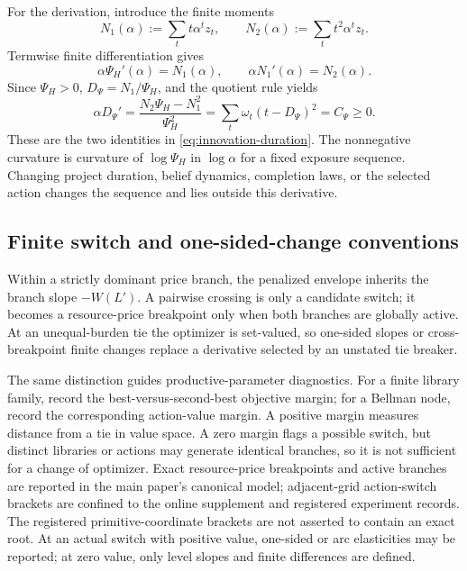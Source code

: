For the derivation, introduce the finite moments
\[
 N_1(\alpha):=\sum_t t\alpha^tz_t,
 \qquad
 N_2(\alpha):=\sum_t t^2\alpha^tz_t.
\]
Termwise finite differentiation gives
\[
 \alpha\Psi_H'(\alpha)=N_1(\alpha),
 \qquad
 \alpha N_1'(\alpha)=N_2(\alpha).
\]
Since \(\Psi_H>0\), \(D_\Psi=N_1/\Psi_H\), and the quotient rule yields
\[
 \alpha D_\Psi'
 =\frac{N_2\Psi_H-N_1^2}{\Psi_H^2}
 =\sum_t\omega_t(t-D_\Psi)^2=C_\Psi\ge0.
\]
These are the two identities in \eqref{eq:innovation-duration}.  The
nonnegative curvature is curvature of \(\log\Psi_H\) in
\(\log\alpha\) for a fixed exposure sequence.  Changing project duration,
belief dynamics, completion laws, or the selected action changes the
sequence and lies outside this derivative.

\subsection{Finite switch and one-sided-change conventions}

Within a strictly dominant price branch, the penalized envelope inherits the
branch slope \(-W(L')\).  A pairwise crossing is only a candidate switch; it
becomes a resource-price breakpoint only when both branches are globally
active.  At an unequal-burden tie the optimizer is set-valued, so one-sided
slopes or cross-breakpoint finite changes replace a derivative selected by an
unstated tie breaker.

The same distinction guides productive-parameter diagnostics.  For a finite
library family, record the best-versus-second-best objective margin; for a
Bellman node, record the corresponding action-value margin.  A positive
margin measures distance from a tie in value space.  A zero margin flags a
possible switch, but distinct libraries or actions may generate identical
branches, so it is not sufficient for a change of optimizer.  Exact
resource-price breakpoints and active branches are reported in the main
paper's canonical model; adjacent-grid action-switch brackets are confined to
the online supplement and registered experiment records.  The registered
primitive-coordinate brackets are not asserted to contain an exact root.  At
an actual switch with positive value, one-sided or arc elasticities may be
reported; at zero value, only level slopes and finite differences are defined.
